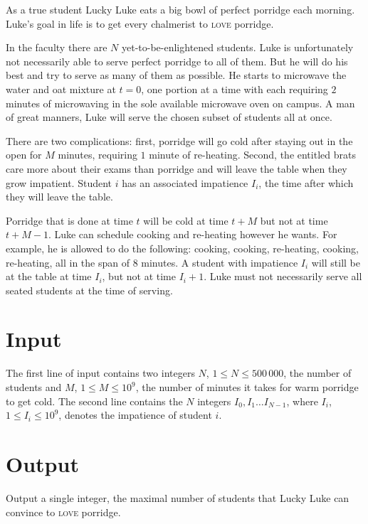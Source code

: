 As a true student Lucky Luke eats a big bowl of perfect porridge each morning. Luke’s goal in life is to get every chalmerist to \textsc{love} porridge.

In the faculty there are $N$ yet-to-be-enlightened students. Luke is unfortunately not necessarily
able to serve perfect porridge to all of them. But he will do his best and try to serve as many of
them as possible. He starts to microwave the water and oat mixture at $t=0$, one portion at a time
with each requiring $2$ minutes of microwaving in the sole available microwave oven on campus. A man
of great manners, Luke will serve the chosen subset of students all at once.

There are two complications: first, porridge will go cold after staying out in the open for $M$ minutes, requiring $1$ minute of re-heating. Second, the entitled brats care more about their exams than porridge and will leave the table when they grow impatient. Student $i$ has an associated impatience $I_i$, the time after which they will leave the table.

Porridge that is done at time $t$ will be cold at time $t+M$ but not at time $t+M-1$. Luke can
schedule cooking and re-heating however he wants. For example, he is allowed to do the following:
cooking, cooking, re-heating, cooking, re-heating, all in the span of $8$ minutes. A student with
impatience $I_i$ will still be at the table at time $I_i$, but not at time $I_i+1$. Luke must not necessarily serve all seated students at the time of serving.



\section*{Input}
The first line of input contains two integers $N$, $1 \leq N \leq 500\,000$, the number of students and $M$, $1 \leq M \leq 10^9$, the number of minutes it takes for warm porridge to get cold. The second line contains the $N$ integers $I_0, I_1 \ldots I_{N-1}$, where $I_i$, $1 \leq I_i \leq 10^9$, denotes the impatience of student $i$.


\section*{Output}
Output a single integer, the maximal number of students that Lucky Luke can convince to \textsc{love} porridge.
